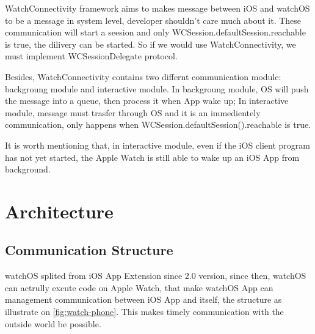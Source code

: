WatchConnectivity framework aims to makes message between iOS and watchOS to be a message in system level, developer shouldn't care much about it. These communication will start a seesion and only WCSession.defaultSession.reachable is true, the dilivery can be started. So if we would use WatchConnectivity, we must implement WCSessionDelegate protocol.

Besides, WatchConnectivity contains two differnt communication module: backgroung module and interactive module. In backgroung module, OS will push the message into a queue, then process it when App wake up; In interactive module, message must trasfer through OS and it is an immedientely communication, only happens when WCSession.defaultSession().reachable is true.

It is worth mentioning that, in interactive module, even if the iOS client program has not yet started, the Apple Watch is still able to wake up an iOS App from background.

\section{Architecture}
\label{sec:arch-design}

\subsection{Communication Structure}
\label{sub:im-arch}

watchOS splited from iOS App Extension since 2.0 version, since then, watchOS can actrully excute code on Apple Watch, that make watchOS App can management communication\cite{WatchGuide:2016} between iOS App and itself, the structure as illustrate on \ref{fig:watch-phone}. This makes timely communication with the outside world be possible.

